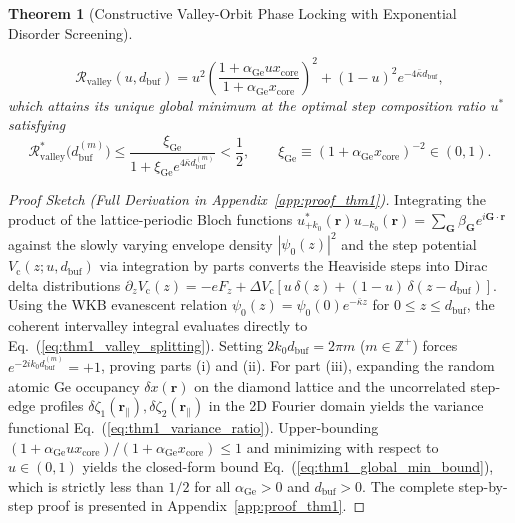 \documentclass[11pt,letterpaper]{article}
\newtheorem{theorem}{Theorem}
\theoremstyle{definition}
\begin{document}
\begin{theorem}[Constructive Valley-Orbit Phase Locking with Exponential Disorder Screening]
\begin{enumerate}
  \begin{equation}
    \mathcal{R}_{\mathrm{valley}}(u, d_{\mathrm{buf}}) = u^2 \left(\frac{1 + \alpha_{\mathrm{Ge}} u x_{\mathrm{core}}}{1 + \alpha_{\mathrm{Ge}} x_{\mathrm{core}}}\right)^2 + (1 - u)^2 e^{-4\bar{\kappa} d_{\mathrm{buf}}},
    \label{eq:thm1_variance_ratio}
  \end{equation}
  which attains its unique global minimum at the optimal step composition ratio $u^*$ satisfying
  \begin{equation}
    \mathcal{R}_{\mathrm{valley}}^*\bigl(d_{\mathrm{buf}}^{(m)}\bigr) \le \frac{\xi_{\mathrm{Ge}}}{1 + \xi_{\mathrm{Ge}} e^{4\bar{\kappa} d_{\mathrm{buf}}^{(m)}}} < \frac{1}{2}, \qquad \xi_{\mathrm{Ge}} \equiv (1 + \alpha_{\mathrm{Ge}} x_{\mathrm{core}})^{-2} \in (0,1).
    \label{eq:thm1_global_min_bound}
  \end{equation}
\end{enumerate}
\end{theorem}

\begin{proof}[Proof Sketch (Full Derivation in Appendix~\ref{app:proof_thm1})]
Integrating the product of the lattice-periodic Bloch functions $u_{+k_0}^*(\mathbf{r}) u_{-k_0}(\mathbf{r}) = \sum_{\mathbf{G}} \beta_{\mathbf{G}} e^{i\mathbf{G}\cdot\mathbf{r}}$ against the slowly varying envelope density $|\psi_0(z)|^2$ and the step potential $V_{\mathrm{c}}(z; u, d_{\mathrm{buf}})$ via integration by parts converts the Heaviside steps into Dirac delta distributions $\partial_z V_{\mathrm{c}}(z) = -e F_z + \Delta V_{\mathrm{c}}[u\,\delta(z) + (1-u)\,\delta(z - d_{\mathrm{buf}})]$. Using the WKB evanescent relation $\psi_0(z) = \psi_0(0) e^{-\bar{\kappa} z}$ for $0 \le z \le d_{\mathrm{buf}}$, the coherent intervalley integral evaluates directly to Eq.~(\ref{eq:thm1_valley_splitting}). Setting $2k_0 d_{\mathrm{buf}} = 2\pi m$ ($m \in \mathbb{Z}^+$) forces $e^{-2i k_0 d_{\mathrm{buf}}^{(m)}} = +1$, proving parts (i) and (ii). For part (iii), expanding the random atomic Ge occupancy $\delta x(\mathbf{r})$ on the diamond lattice and the uncorrelated step-edge profiles $\delta\zeta_1(\mathbf{r}_\parallel), \delta\zeta_2(\mathbf{r}_\parallel)$ in the 2D Fourier domain yields the variance functional Eq.~(\ref{eq:thm1_variance_ratio}). Upper-bounding $(1 + \alpha_{\mathrm{Ge}} u x_{\mathrm{core}})/(1 + \alpha_{\mathrm{Ge}} x_{\mathrm{core}}) \le 1$ and minimizing with respect to $u \in (0,1)$ yields the closed-form bound Eq.~(\ref{eq:thm1_global_min_bound}), which is strictly less than $1/2$ for all $\alpha_{\mathrm{Ge}} > 0$ and $d_{\mathrm{buf}} > 0$. The complete step-by-step proof is presented in Appendix~\ref{app:proof_thm1}.
\end{proof}
\end{document}
